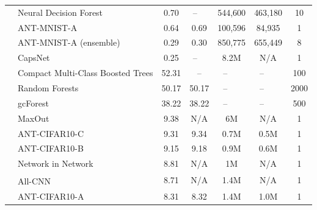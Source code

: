 \begin{table}[t]
\begin{tabular}{|c|l|cc|cc|c|}
		& Neural Decision Forest \cite{kontschieder2015deep} & 0.70 & --~~ & 544,600 & 463,180 & 10\\
		&\cellcolor{gray!10}ANT-MNIST-A &\cellcolor{gray!10} 0.64 &\cellcolor{gray!10} 0.69 &\cellcolor{gray!10} 100,596&\cellcolor{gray!10} 84,935 &\cellcolor{gray!10} 1\\
		&\cellcolor{gray!10}ANT-MNIST-A (ensemble) &\cellcolor{gray!10} 0.29 &\cellcolor{gray!10} 0.30 &\cellcolor{gray!10} 850,775 &\cellcolor{gray!10} 655,449 &\cellcolor{gray!10} 8 \\
        & CapsNet \cite{sabour2017dynamic} & 0.25 & --~~ & 8.2M & N/A & 1\\
		\hline
		\parbox[t]{2mm}{}                
        & Compact Multi-Class Boosted Trees \cite{ponomareva2017compact} & 52.31 & -- & --~~~  & --~~~ &100 \\
        & Random Forests  \cite{breiman2001random}& 50.17 & 50.17 & --~~~ & --~~~ &2000\\
		& gcForest \cite{zhou2017deepft} & 38.22&  38.22 & --~~~  & --~~~  & 500\\
		& MaxOut \cite{goodfellow2013maxout} & 9.38 & N/A& 6M & N/A & 1\\
        &ANT-CIFAR10-C & 9.31 &   9.34&  0.7M & 0.5M & 1\\
        &ANT-CIFAR10-B & 9.15 &   9.18&  0.9M &0.6M& 1\\
		& Network in Network \cite{lin2013network} & 8.81 & N/A & 1M  &N/A &1 \\
		& All-CNN\textsuperscript{\textdagger}\cite{springenberg2014striving} & 8.71 & N/A & 1.4M  & N/A &1 \\
		&ANT-CIFAR10-A & 8.31 &   8.32 &1.4M&1.0M & 1\\

\end{tabular}
\end{table}
